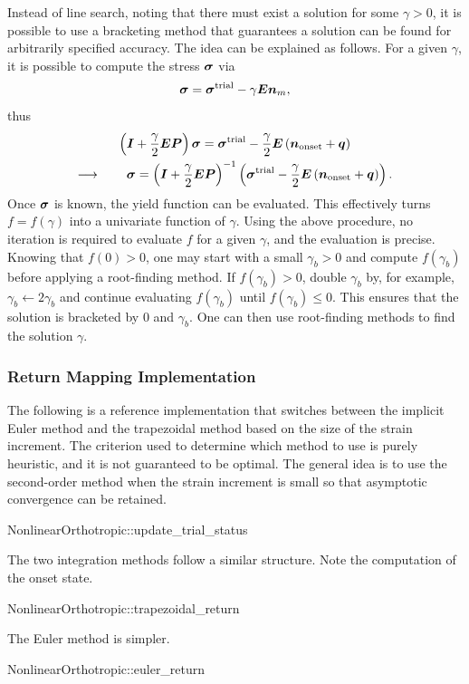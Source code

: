 Instead of line search, noting that there must exist a solution for some $\gamma>0$, it is possible to use a bracketing method that guarantees a solution can be found for arbitrarily specified accuracy.
The idea can be explained as follows.
For a given $\gamma$, it is possible to compute the stress $\bm{\sigma}$ via
\begin{gather}
    \bm{\sigma}=\bm{\sigma}^\text{trial}-\gamma\bm{E}\bm{n}_m,
\end{gather}
thus
\begin{multline}
    \left(\bm{I}+\dfrac{\gamma}{2}\bm{E}\bm{P}\right)\bm{\sigma}=\bm{\sigma}^\text{trial}-\dfrac{\gamma}{2}\bm{E}\left(\bm{n}_\text{onset}+\bm{q}\right) \\\longrightarrow\qquad
    \bm{\sigma}=\left(\bm{I}+\dfrac{\gamma}{2}\bm{E}\bm{P}\right)^{-1}\left(\bm{\sigma}^\text{trial}-\dfrac{\gamma}{2}\bm{E}\left(\bm{n}_\text{onset}+\bm{q}\right)\right).
\end{multline}
Once $\bm{\sigma}$ is known, the yield function can be evaluated.
This effectively turns $f=f\left(\gamma\right)$ into a univariate function of $\gamma$.
Using the above procedure, no iteration is required to evaluate $f$ for a given $\gamma$, and the evaluation is precise.
Knowing that $f\left(0\right)>0$, one may start with a small $\gamma_b>0$ and compute $f\left(\gamma_b\right)$ before applying a root-finding method.
If $f\left(\gamma_b\right)>0$, double $\gamma_b$ by, for example, $\gamma_b\leftarrow2\gamma_b$ and continue evaluating $f\left(\gamma_b\right)$ until $f\left(\gamma_b\right)\leqslant0$.
This ensures that the solution is bracketed by $0$ and $\gamma_b$.
One can then use root-finding methods to find the solution $\gamma$.
\subsubsection{Return Mapping Implementation}
The following is a reference implementation that switches between the implicit Euler method and the trapezoidal method based on the size of the strain increment.
The criterion used to determine which method to use is purely heuristic, and it is not guaranteed to be optimal.
The general idea is to use the second-order method when the strain increment is small so that asymptotic convergence can be retained.
\begin{cppcode}
NonlinearOrthotropic::update_trial_status
\end{cppcode}

The two integration methods follow a similar structure.
Note the computation of the onset state.
\begin{cppcode}
NonlinearOrthotropic::trapezoidal_return
\end{cppcode}

The Euler method is simpler.
\begin{cppcode}
NonlinearOrthotropic::euler_return
\end{cppcode}
